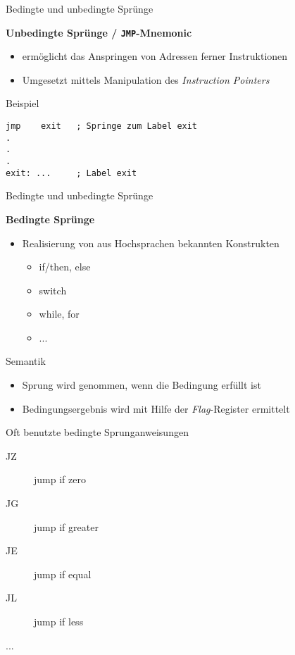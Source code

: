 \begin{frame}[fragile]{Bedingte und unbedingte Sprünge}

\begin{center}
\textbf{Unbedingte Sprünge / \texttt{JMP}-Mnemonic}
\end{center}

\begin{itemize}
    \item ermöglicht das Anspringen von Adressen ferner Instruktionen
    \item Umgesetzt mittels Manipulation des \textit{Instruction Pointers}
\end{itemize}

\makebox{}

Beispiel
\begin{lstlisting}
jmp    exit   ; Springe zum Label exit
.
.
.
exit: ...     ; Label exit
\end{lstlisting}
\end{frame}

\begin{frame}[fragile]{Bedingte und unbedingte Sprünge}

\begin{center}
\textbf{Bedingte Sprünge}
\end{center}

\begin{itemize}
    \item Realisierung von aus Hochsprachen bekannten Konstrukten
    \begin{itemize}
        \item if/then, else
        \item switch
        \item while, for
        \item ...
    \end{itemize}
\end{itemize}

\makebox{}

Semantik
\begin{itemize}
    \item Sprung wird genommen, wenn die Bedingung erfüllt ist
    \item Bedingungsergebnis wird mit Hilfe der \textit{Flag}-Register ermittelt
\end{itemize}
\end{frame}


\begin{frame}
Oft benutzte bedingte Sprunganweisungen
\begin{description}
    \item [JZ] jump if zero
    \item [JG] jump if greater
    \item [JE] jump if equal
    \item [JL] jump if less
    \item [...]
\end{description}
\end{frame}


